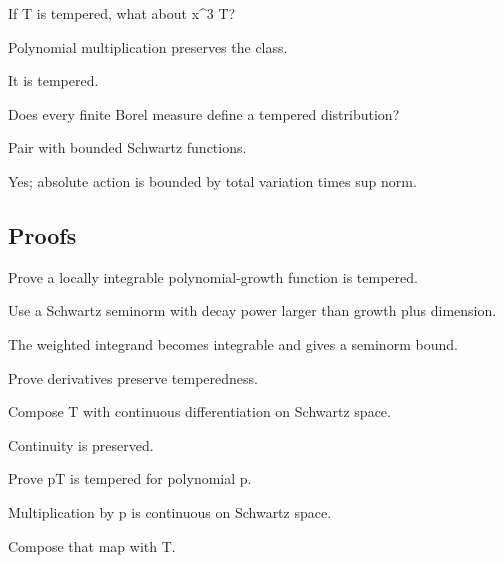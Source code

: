 \begin{exercise}\label{exr:iii18-expand-04}
If T is tempered, what about x\textasciicircum{}3 T?
\end{exercise}
\begin{hint}
Polynomial multiplication preserves the class.
\end{hint}
\begin{solution}
It is tempered.
\end{solution}

\begin{exercise}\label{exr:iii18-expand-05}
Does every finite Borel measure define a tempered distribution?
\end{exercise}
\begin{hint}
Pair with bounded Schwartz functions.
\end{hint}
\begin{solution}
Yes; absolute action is bounded by total variation times sup norm.
\end{solution}

\subsection*{Proofs}

\begin{exercise}\label{exr:iii18-expand-06}
Prove a locally integrable polynomial-growth function is tempered.
\end{exercise}
\begin{hint}
Use a Schwartz seminorm with decay power larger than growth plus dimension.
\end{hint}
\begin{solution}
The weighted integrand becomes integrable and gives a seminorm bound.
\end{solution}

\begin{exercise}\label{exr:iii18-expand-07}
Prove derivatives preserve temperedness.
\end{exercise}
\begin{hint}
Compose T with continuous differentiation on Schwartz space.
\end{hint}
\begin{solution}
Continuity is preserved.
\end{solution}

\begin{exercise}\label{exr:iii18-expand-08}
Prove pT is tempered for polynomial p.
\end{exercise}
\begin{hint}
Multiplication by p is continuous on Schwartz space.
\end{hint}
\begin{solution}
Compose that map with T.
\end{solution}

